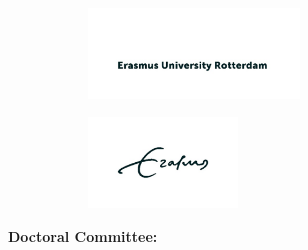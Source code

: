 \begin{figure}[hb]
\begin{subfigure}[t]{0.5\textwidth}
\includegraphics[width=0.9\linewidth, height=2.4cm]{figures/left.png}
\end{subfigure}\hspace{33mm}
\begin{subfigure}[t]{0.5\textwidth}
\includegraphics[width=0.9\linewidth, height=2.4cm]{figures/right.png}
\end{subfigure}
\end{figure}

\newpage

\textbf{Doctoral Committee:}\par
\vspace*{0.8cm}

\newpage
{}
\tableofcontents
\clearpage

